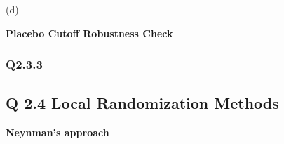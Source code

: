 \documentclass[11pt]{article}
\begin{document}
(d)

\begin{center}
	\centering
	\textbf{Placebo Cutoff Robustness Check }\par\medskip
	\scalebox{.9}{
		
	}
\end{center}
\subsubsection{Q2.3.3}

\subsection{Q 2.4 Local Randomization Methods }


\begin{center}
	\centering
	\textbf{Neynman's approach }\par\medskip
	\scalebox{.9}{
		
	}
\end{center}


\end{document}

